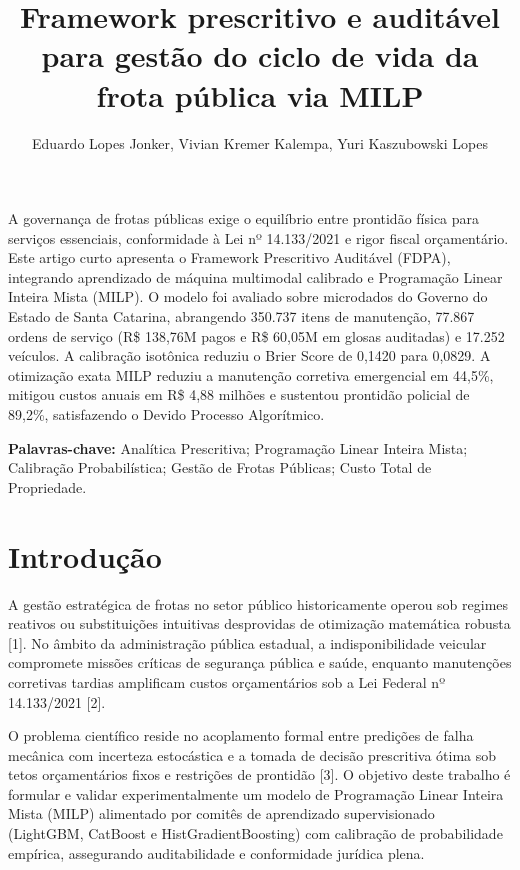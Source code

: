 \documentclass[12pt,a4paper]{article}
\title{\textbf{Framework prescritivo e auditável para gestão do ciclo de vida da frota pública via MILP}}
\author{Eduardo Lopes Jonker\inst{1}, Vivian Kremer Kalempa\inst{1}, Yuri Kaszubowski Lopes\inst{1}}
\begin{document}
\maketitle

\begin{resumo}
A governança de frotas públicas exige o equilíbrio entre prontidão física para serviços essenciais, conformidade à Lei nº 14.133/2021 e rigor fiscal orçamentário. Este artigo curto apresenta o Framework Prescritivo Auditável (FDPA), integrando aprendizado de máquina multimodal calibrado e Programação Linear Inteira Mista (MILP). O modelo foi avaliado sobre microdados do Governo do Estado de Santa Catarina, abrangendo 350.737 itens de manutenção, 77.867 ordens de serviço (R\$ 138,76M pagos e R\$ 60,05M em glosas auditadas) e 17.252 veículos. A calibração isotônica reduziu o Brier Score de 0,1420 para 0,0829. A otimização exata MILP reduziu a manutenção corretiva emergencial em 44,5\%, mitigou custos anuais em R\$ 4,88 milhões e sustentou prontidão policial de 89,2\%, satisfazendo o Devido Processo Algorítmico.

\vspace{0.2cm}
\noindent\textbf{Palavras-chave:} Analítica Prescritiva; Programação Linear Inteira Mista; Calibração Probabilística; Gestão de Frotas Públicas; Custo Total de Propriedade.
\end{resumo}



\section{Introdução}

A gestão estratégica de frotas no setor público historicamente operou sob regimes reativos ou substituições intuitivas desprovidas de otimização matemática robusta [1]. No âmbito da administração pública estadual, a indisponibilidade veicular compromete missões críticas de segurança pública e saúde, enquanto manutenções corretivas tardias amplificam custos orçamentários sob a Lei Federal nº 14.133/2021 [2].

O problema científico reside no acoplamento formal entre predições de falha mecânica com incerteza estocástica e a tomada de decisão prescritiva ótima sob tetos orçamentários fixos e restrições de prontidão [3]. O objetivo deste trabalho é formular e validar experimentalmente um modelo de Programação Linear Inteira Mista (MILP) alimentado por comitês de aprendizado supervisionado (LightGBM, CatBoost e HistGradientBoosting) com calibração de probabilidade empírica, assegurando auditabilidade e conformidade jurídica plena.
\end{document}
